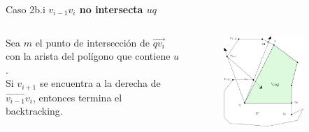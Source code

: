 \documentclass[aspectratio=169,xcolor=dvipsnames, t]{beamer}
\begin{document}

\begin{frame}{Caso 2b.i}
  \textbf{$v_{i-1}v_{i}$ no intersecta $uq$}\\
  \vspace{0.5cm}
  \begin{columns}
    \begin{column}{0.45\textwidth}
      Sea $m$ el punto de intersección de $\overrightarrow{qv_{i}}$ con la arista del polígono que contiene $u$.\\
      \vspace{0.5cm}
      Si $v_{i+1}$ se encuentra a la derecha de $\overrightarrow{v_{i-1}v_{i}}$, entonces termina el backtracking.
    \end{column}
    \begin{column}{0.45\textwidth}  %
      \vspace{-2.5cm}
      \begin{figure}
        \centering
        \includegraphics[width=0.75\textwidth]{imagenes/Caso2.6a.png}
      \end{figure}
    \end{column}
  \end{columns}
\end{frame}

\end{document}

